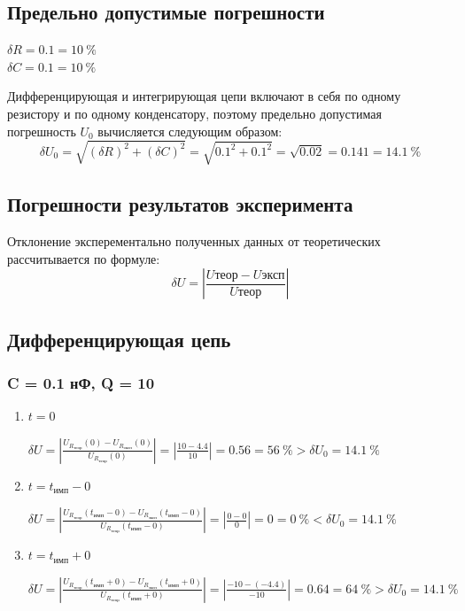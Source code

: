 \subsection{Предельно допустимые погрешности}

\begin{center}
	$\delta R = 0.1 = 10~\%$\\
	$\delta C = 0.1 = 10~\%$\\
\end{center}

Дифференцирующая и интегрирующая цепи включают в себя по одному резистору и по одному конденсатору, поэтому предельно допустимая погрешность $U_0$ вычисляется следующим образом:
\[
\delta U_0 = \sqrt{(\delta R)^2 + (\delta C)^2} = \sqrt{0.1^2 + 0.1^2} = \sqrt{0.02} = 0.141 = 14.1~\%
\]

\subsection{Погрешности результатов эксперимента}

Отклонение эксперементально полученных данных от теоретических рассчитывается по формуле:
\[
\delta U = \left|\frac{U\text{теор}-U\text{эксп}}{U\text{теор}}\right|
\]

\subsection{Дифференцирующая цепь}

\subsubsection{C = 0.1 нФ, Q = 10}

\begin{enumerate}
\item $t = 0$

	$\delta U = \left| \frac{U_{R_\text{теор}}(0) - U_{R_\text{эксп}}(0)}{U_{R_\text{теор}}(0)} \right| = \left| \frac{10 - 4.4}{10} \right| = 0.56 = 56~\% > \delta U_0 = 14.1~\%$

\item $t = t_\text{имп}-0$

	$\delta U = \left| \frac{U_{R_\text{теор}}(t_\text{имп}-0) - U_{R_\text{эксп}}(t_\text{имп}-0)}{U_{R_\text{теор}}(t_\text{имп}-0)} \right| = \left| \frac{0 - 0}{0} \right| = 0 = 0~\% < \delta U_0 = 14.1~\%$

\item  $t = t_\text{имп}+0$

	$\delta U = \left| \frac{U_{R_\text{теор}}(t_\text{имп}+0) - U_{R_\text{эксп}}(t_\text{имп}+0)}{U_{R_\text{теор}}(t_\text{имп}+0)} \right| = \left| \frac{-10 - (-4.4)}{-10} \right| = 0.64 = 64~\% > \delta U_0 = 14.1~\%$
\end{enumerate}

